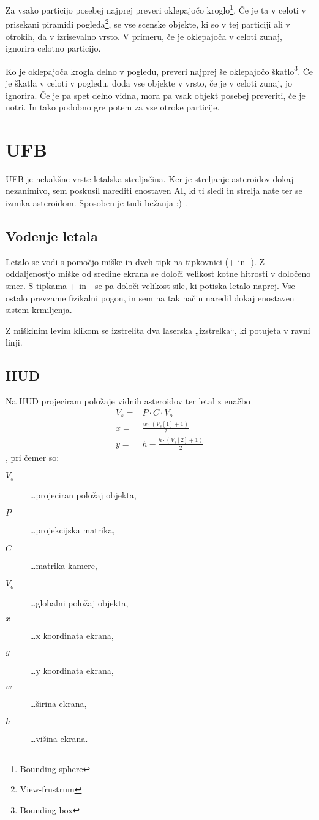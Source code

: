\documentclass[a4paper]{article}
\begin{document}
Za vsako particijo posebej najprej preveri oklepajočo kroglo\footnote{Bounding sphere}. Če je ta v celoti v prisekani piramidi pogleda\footnote{View-frustrum}, se vse scenske objekte, ki so v tej particiji ali v otrokih, da v izrisevalno vrsto. V primeru, če je oklepajoča v celoti zunaj, ignorira celotno particijo.

Ko je oklepajoča krogla delno v pogledu, preveri najprej še oklepajočo škatlo\footnote{Bounding box}. Če je škatla v celoti v pogledu, doda vse objekte v vrsto, če je v celoti zunaj, jo ignorira. Če je pa spet delno vidna, mora pa vsak objekt posebej preveriti, če je notri. In tako podobno gre potem za vse otroke particije.

\section{UFB}
UFB je nekakšne vrste letalska streljačina. Ker je streljanje asteroidov dokaj nezanimivo, sem poskusil narediti enostaven AI, ki ti sledi in strelja nate ter se izmika asteroidom. Sposoben je tudi bežanja :) .

\subsection{Vodenje letala}
Letalo se vodi s pomočjo miške in dveh tipk na tipkovnici (+ in -). Z oddaljenostjo miške od sredine ekrana se določi velikost kotne hitrosti v določeno smer. S tipkama + in - se pa določi velikost sile, ki potiska letalo naprej. Vse ostalo prevzame fizikalni pogon, in sem na tak način naredil dokaj enostaven sistem krmiljenja.

Z miškinim levim klikom se izstrelita dva laserska „izstrelka“, ki potujeta v ravni linji.

\subsection{HUD}
Na HUD projeciram položaje vidnih asteroidov ter letal z enačbo
\begin{eqnarray*}
V_s =& P \cdot C \cdot V_o\\
x =& \frac{w \cdot (V_s[1] + 1)}{2} \\
y =& h - \frac{h \cdot (V_s[2] + 1)}{2}
\end{eqnarray*},
pri čemer so:
\begin{description}
  \item[$V_s$] \dots projeciran položaj objekta,
  \item[$P$] \dots projekcijska matrika,
  \item[$C$] \dots matrika kamere,
  \item[$V_o$] \dots globalni položaj objekta,
  \item[$x$] \dots x koordinata ekrana,
  \item[$y$] \dots y koordinata ekrana,
  \item[$w$] \dots širina ekrana,
  \item[$h$] \dots višina ekrana.
\end{description}
\end{document}
